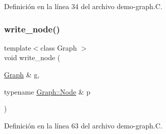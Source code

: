 Definición en la línea 34 del archivo demo-\/graph.\+C.

\mbox{\label{demo-graph_8_c_abe260b66e94b606f11fd75beedd0f6dc}} 
\subsubsection{\texorpdfstring{write\+\_\+node()}{write\_node()}}
{\footnotesize\ttfamily template$<$class Graph $>$ \\
void write\+\_\+node (\begin{DoxyParamCaption}\item[{\hyperlink{class_designar_1_1_graph}{Graph} \&}]{g,  }\item[{typename \hyperlink{class_designar_1_1_graph_a5dfc7dba9d092ac489c72e40390c37d0}{Graph\+::\+Node} \&}]{p }\end{DoxyParamCaption})}



Definición en la línea 63 del archivo demo-\/graph.\+C.

